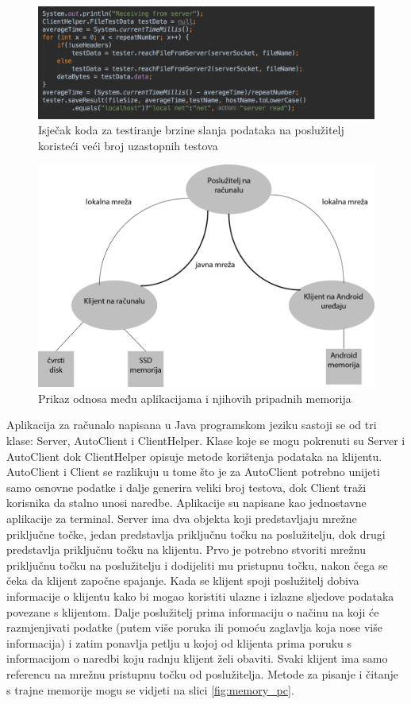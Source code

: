 \documentclass[times, utf8, zavrsni, square]{fer}
\begin{document}
\begin{figure}[h!]
    \centering
    \includegraphics[width=1\textwidth]{time_measure}
    \caption{Isječak koda za testiranje brzine slanja podataka na poslužitelj koristeći veći broj uzastopnih testova}
    \label{fig:time}
\end{figure} 
\begin{figure}[h!]
    \centering
    \includegraphics[width=1\textwidth]{graf_relations}
    \caption{Prikaz odnosa među aplikacijama i njihovih pripadnih memorija}
    \label{fig:relations}
\end{figure} 

Aplikacija za računalo napisana u Java programskom jeziku sastoji se od tri klase: Server, AutoClient i ClientHelper. 
Klase koje se mogu pokrenuti su Server i AutoClient dok ClientHelper opisuje metode korištenja podataka na klijentu.
AutoClient i Client se razlikuju u tome što je za AutoClient potrebno unijeti samo osnovne podatke i dalje generira veliki broj testova, dok Client traži korisnika da stalno unosi naredbe.
Aplikacije su napisane kao jednostavne aplikacije za terminal.
Server ima dva objekta koji predstavljaju mrežne priključne točke, jedan predstavlja priključnu točku na poslužitelju, dok drugi predstavlja priključnu točku na klijentu.
Prvo je potrebno stvoriti mrežnu priključnu točku na poslužitelju i dodijeliti mu pristupnu točku, nakon čega se čeka da klijent započne spajanje.
Kada se klijent spoji poslužitelj dobiva informacije o klijentu kako bi mogao koristiti ulazne i izlazne sljedove podataka povezane s klijentom.
Dalje poslužitelj prima informaciju o načinu na koji će razmjenjivati podatke (putem više poruka ili pomoću zaglavlja koja nose više informacija) i zatim ponavlja petlju u kojoj od klijenta prima poruku s informacijom o naredbi koju radnju klijent želi obaviti.
Svaki klijent ima samo referencu na mrežnu pristupnu točku od poslužitelja. 
Metode za pisanje i čitanje s trajne memorije mogu se vidjeti na slici \ref{fig:memory_pc}.
\end{document}
